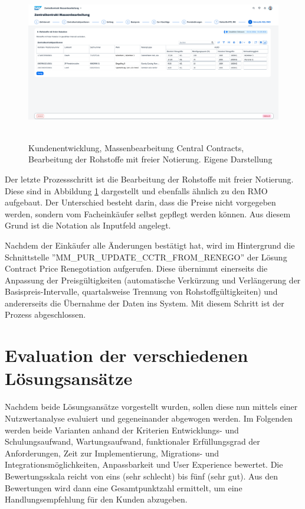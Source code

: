 \begin{figure}[H]
    \centering
    \includegraphics[height=6.91cm]{Bilder/Praxisteil-KL-Schritt-8.png}
    \caption[Kundenentwicklung, Massenbearbeitung Central Contracts, Bearbeitung der Rohstoffe mit freier Notierung]{Kundenentwicklung, Massenbearbeitung Central Contracts, Bearbeitung der Rohstoffe mit freier Notierung. Eigene Darstellung}
    \label{fig:PraxisKLSchritt8}
\end{figure}

Der letzte Prozessschritt ist die Bearbeitung der Rohstoffe mit freier Notierung. Diese sind in Abbildung \ref{fig:PraxisKLSchritt8} dargestellt und ebenfalls ähnlich zu den RMO aufgebaut. Der Unterschied besteht darin, dass die Preise nicht vorgegeben werden, sondern vom Facheinkäufer selbst gepflegt werden können. Aus diesem Grund ist die Notation als Inputfeld angelegt.

Nachdem der Einkäufer alle Änderungen bestätigt hat, wird im Hintergrund die Schnittstelle ''MM\_PUR\_UPDATE\_CCTR\_FROM\_RENEGO'' der Lösung Contract Price Renegotiation aufgerufen. Diese übernimmt einerseits die Anpassung der Preisgültigkeiten (automatische Verkürzung und Verlängerung der Basispreis-Intervalle, quartalsweise Trennung von Rohstoffgültigkeiten) und andererseits die Übernahme der Daten ins System. Mit diesem Schritt ist der Prozess abgeschlossen.

\section{Evaluation der verschiedenen Lösungsansätze}

Nachdem beide Lösungsansätze vorgestellt wurden, sollen diese nun mittels einer Nutzwertanalyse evaluiert und gegeneinander abgewogen werden. Im Folgenden werden beide Varianten anhand der Kriterien Entwicklungs- und Schulungsaufwand, Wartungsaufwand, funktionaler Erfüllungsgrad der Anforderungen, Zeit zur Implementierung, Migrations- und Integrationsmöglichkeiten, Anpassbarkeit und User Experience bewertet. Die Bewertungsskala reicht von eins (sehr schlecht) bis fünf (sehr gut). Aus den Bewertungen wird dann eine Gesamtpunktzahl ermittelt, um eine Handlungsempfehlung für den Kunden abzugeben.

